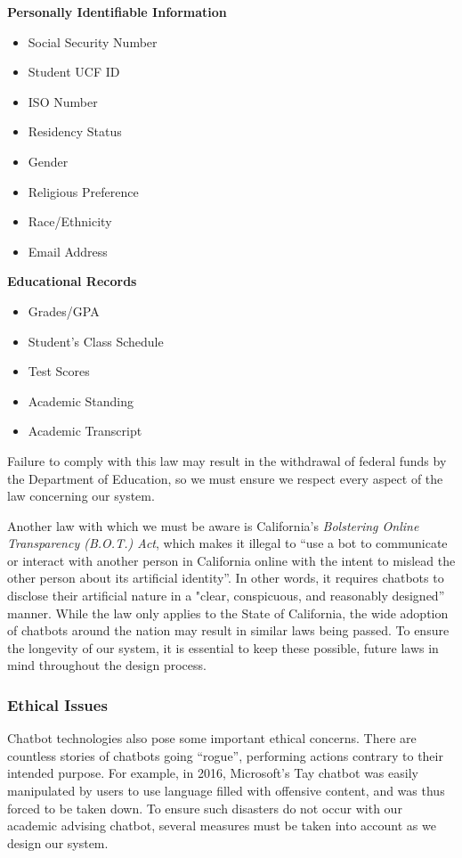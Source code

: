 \documentclass[titlepage, 12pt]{article}
\begin{document}
\textbf{Personally Identifiable Information}
\begin{itemize}
    \item Social Security Number
    \item Student UCF ID
    \item ISO Number
    \item Residency Status
    \item Gender
    \item Religious Preference
    \item Race/Ethnicity
    \item Email Address
\end{itemize}

\textbf{Educational Records}
\begin{itemize}
    \item Grades/GPA
    \item Student’s Class Schedule
    \item Test Scores
    \item Academic Standing
    \item Academic Transcript
\end{itemize}

Failure to comply with this law may result in the withdrawal of federal funds by the Department of Education, so we must ensure we respect every aspect of the law concerning our system.

Another law with which we must be aware is California’s \emph{Bolstering Online Transparency (B.O.T.) Act}, which makes it illegal to “use a bot to communicate or interact with another person in California online with the intent to mislead the other person about its artificial identity”. In other words, it requires chatbots to disclose their artificial nature in a "clear, conspicuous, and reasonably designed” manner. While the law only applies to the State of California, the wide adoption of chatbots around the nation may result in similar laws being passed. To ensure the longevity of our system, it is essential to keep these possible, future laws in mind throughout the design process.

\subsubsection{Ethical Issues}

Chatbot technologies also pose some important ethical concerns. There are countless stories of chatbots going “rogue”, performing actions contrary to their intended purpose. For example, in 2016, Microsoft’s Tay chatbot was easily manipulated by users to use language filled with offensive content, and was thus forced to be taken down. To ensure such disasters do not occur with our academic advising chatbot, several measures must be taken into account as we design our system.
\end{document}
